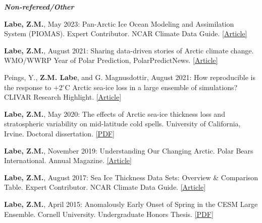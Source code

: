 \documentclass[margin,line,palatino,courier,10pt]{res}
\begin{document}
\begin{resume}
\textit{\textbf{Non-refereed/Other}}
\vspace*{-0.1in}\\
\begin{etaremune}[leftmargin=0in,topsep=0in,parsep=0in]
\item \textbf{Labe, Z.M.}, May 2023: Pan-Arctic Ice Ocean Modeling and Assimilation System (PIOMAS). Expert Contributor. NCAR Climate Data Guide. \href{https://climatedataguide.ucar.edu/climate-data/pan-arctic-ice-ocean-modeling-and-assimilation-system-piomas}{[Article]}
\item \textbf{Labe, Z.M.}, August 2021: Sharing data-driven stories of Arctic climate change. WMO/WWRP Year of Polar Prediction, PolarPredictNews. \href{https://www.polarprediction.net/fileadmin/user_upload/www.polarprediction.net/Home/News/PolarPredictNews/PolarPredictNews_18_screen.pdf}{[Article]}
\item Peings, Y., \textbf{Z.M. Labe}, and G. Magnusdottir, August 2021: How reproducible is the response to $+$2$^{\circ}$C Arctic sea-ice loss in a large ensemble of simulations? CLIVAR Research Highlight. \href{https://usclivar.org/research-highlights/how-reproducible-response-2degc-arctic-sea-ice-loss-large-ensemble-simulations}{[Article]}
\item \textbf{Labe, Z.M.}, May 2020: The effects of Arctic sea-ice thickness loss and stratospheric variability on mid-latitude cold spells. University of California, Irvine. Doctoral dissertation. \href{https://escholarship.org/uc/item/778982rr}{[PDF]}
\item \textbf{Labe, Z.M.}, November 2019: Understanding Our Changing Arctic. Polar Bears International. Annual Magazine. \href{https://assets.ctfassets.net/i04syw39vv9p/4fPb2dw3vlHMbiLWsUPObz/baaa11beacec0f3b70297cfd33639ad7/pbi_2019_newsmag_web.pdf}{[Article]}
\item \textbf{Labe, Z.M.}, August 2017: Sea Ice Thickness Data Sets: Overview \& Comparison Table. Expert Contributor. NCAR Climate Data Guide. \href{https://climatedataguide.ucar.edu/climate-data/sea-ice-thickness-data-sets-overview-comparison-table}{[Article]}
\item \textbf{Labe, Z.M.}, April 2015: Anomalously Early Onset of Spring in the CESM Large Ensemble. Cornell University. Undergraduate Honors Thesis. \href{https://zacklabe.files.wordpress.com/2022/08/d1f36-labe_thesis2015.pdf}{[PDF]}
\end{etaremune}

\vspace{-0.1in}
\noindent\textcolor{MidnightBlue}{\makebox[\linewidth][r]{\rule{\textwidth}{5pt}}}
\vspace{-0.3in} 


\end{resume}
\end{document}
